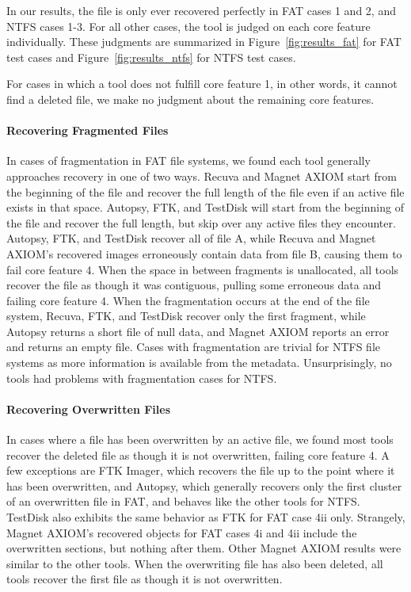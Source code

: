 \begin{paraphrase}
In our results, the file is only ever recovered perfectly in FAT cases 1 and 2, and NTFS cases 1-3. 
For all other cases, the tool is judged on each core feature individually. 
These judgments are summarized in Figure~\ref{fig:results_fat} for FAT test cases and Figure~\ref{fig:results_ntfs} for NTFS test cases.

For cases in which a tool does not fulfill core feature 1, in other words, it cannot find a deleted file, we make no judgment about the remaining core features.

\paragraph{Recovering Fragmented Files}
In cases of fragmentation in FAT file systems, we found each tool generally approaches recovery in one of two ways. 
Recuva and Magnet AXIOM start from the beginning of the file and recover the full length of the file even if an active file exists in that space. 
Autopsy, FTK, and TestDisk will start from the beginning of the file and recover the full length, but skip over any active files they encounter.
Autopsy, FTK, and TestDisk recover all of file A, while Recuva and Magnet AXIOM's recovered images erroneously contain data from file B, causing them to fail core feature 4. 
When the space in between fragments is unallocated, all tools recover the file as though it was contiguous, pulling some erroneous data and failing core feature 4. 
When the fragmentation occurs at the end of the file system, Recuva, FTK, and TestDisk recover only the first fragment, while Autopsy returns a short file of null data, and Magnet AXIOM reports an error and returns an empty file.
Cases with fragmentation are trivial for NTFS file systems as more information is available from the metadata. 
Unsurprisingly, no tools had problems with fragmentation cases for NTFS.

\paragraph{Recovering Overwritten Files}
In cases where a file has been overwritten by an active file, we found most tools recover the deleted file as though it is not overwritten, failing core feature 4. 
A few exceptions are FTK Imager, which recovers the file up to the point where it has been overwritten, and Autopsy, which generally recovers only the first cluster of an overwritten file in FAT, and behaves like the other tools for NTFS. 
TestDisk also exhibits the same behavior as FTK for FAT case 4ii only. 
Strangely, Magnet AXIOM's recovered objects for FAT cases 4i and 4ii include the overwritten sections, but nothing after them.
Other Magnet AXIOM results were similar to the other tools.
When the overwriting file has also been deleted, all tools recover the first file as though it is not overwritten.


\end{paraphrase}
